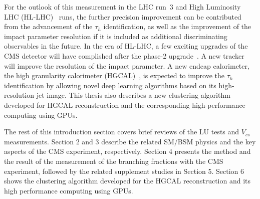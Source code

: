 For the outlook of this measurement in the LHC run~3 and High Luminosity LHC (HL-LHC)~\cite{Apollinari:2284929} runs, the further precision improvement can be contributed from the advancement of the $\tau_h$ identification, as well as the improvement of the impact parameter resolution if it is included as additional discriminating observables in the future. In the era of HL-LHC, a few exciting upgrades of the CMS detector will have complished after the phase-2 upgrade~\cite{CMSCollaboration:2015zni}. A new tracker~\cite{Klein:2017nke} will improve the resolution of the impact parameter. A new endcap calorimeter, the high granularity calorimeter (HGCAL)~\cite{Collaboration:2293646}, is expected to improve the $\tau_h$ identification by allowing novel deep learning algorithms based on its high-resolution jet image. This thesis also describes a new clustering algorithm developed for HGCAL reconstruction and the corresponding high-performance computing using GPUs.



The rest of this introduction section covers brief reviews of the LU tests and $V_{cs}$ measurements. 
Section 2 and 3 describe the related SM/BSM physics and the key aspects of the CMS experiment, respectively.
Section 4 presents the method and the result of the measurement of the \PW branching fractions with the CMS experiment, followed by the related supplement studies in Section 5.
Section 6 shows the clustering algorithm developed for the HGCAL reconstruction and its high performance computing using GPUs.




















